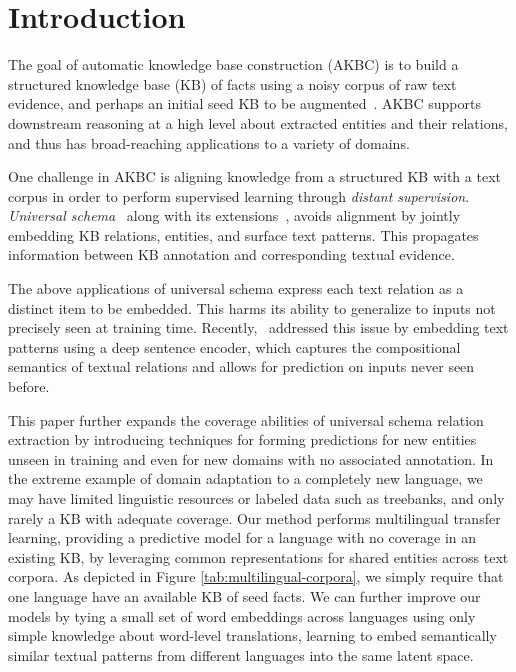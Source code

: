 
\section{Introduction}
\label{introduction}
The goal of automatic knowledge base construction (AKBC) is to build a structured knowledge base (KB) of facts using a noisy corpus of raw text evidence, and perhaps an initial seed KB to be augmented~\citep{NELL,yago,freebase}. AKBC supports downstream reasoning at a high level about extracted entities and their relations, and thus has broad-reaching applications to a variety of domains.

One challenge in AKBC is aligning knowledge from a structured KB with a text corpus in order to perform supervised learning through \emph{distant supervision}. \emph{Universal schema}~\citep{limin} along with its extensions~\citep{yao2013universal,vector_pra,neelakantan2015compositional,logicmfnaacl15}, avoids alignment by jointly embedding KB relations, entities, and surface text patterns. This propagates information between KB annotation and corresponding textual evidence.

The above applications of universal schema express each text relation as a distinct item to be embedded. This harms its ability to generalize to inputs not precisely seen at training time. Recently,~\citet{toutanova2015representing} addressed this issue by embedding text patterns using a deep sentence encoder, which captures the compositional semantics of textual relations and allows for prediction on inputs never seen before. 

This paper further expands the coverage abilities of universal schema relation extraction by introducing techniques for forming predictions for new entities unseen in training and even for new domains with no associated annotation. In the extreme example of domain adaptation to a completely new language, we may have limited linguistic resources or labeled data such as treebanks, and only rarely a KB with adequate coverage. Our method performs multilingual transfer learning, providing a predictive model for a language with no coverage in an existing KB, by leveraging common representations for shared entities across text corpora. As depicted in Figure \ref{tab:multilingual-corpora}, we simply require that one language have an available KB of seed facts. We can further improve our models by tying a small set of word embeddings across languages using only simple knowledge about word-level translations, learning to embed semantically similar textual patterns from different languages into the same latent space. 


